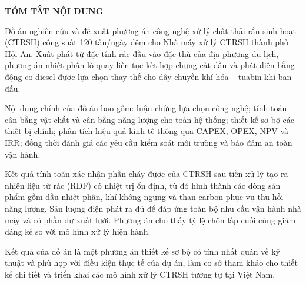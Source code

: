 \documentclass[../main.tex]{subfiles}
\begin{document}
\begin{center}
    \Large{\textbf{TÓM TẮT NỘI DUNG}}\\
\end{center}
\vspace{1cm}

Đồ án nghiên cứu và đề xuất phương án công nghệ xử lý chất thải rắn sinh hoạt (CTRSH) công suất 120 tấn/ngày đêm cho Nhà máy xử lý CTRSH thành phố Hội An. Xuất phát từ đặc tính rác đầu vào đặc thù của địa phương du lịch, phương án nhiệt phân lò quay liên tục kết hợp chưng cất dầu và phát điện bằng động cơ diesel được lựa chọn thay thế cho dây chuyền khí hóa -- tuabin khí ban đầu.

Nội dung chính của đồ án bao gồm: luận chứng lựa chọn công nghệ; tính toán cân bằng vật chất và cân bằng năng lượng cho toàn hệ thống; thiết kế sơ bộ các thiết bị chính; phân tích hiệu quả kinh tế thông qua CAPEX, OPEX, NPV và IRR; đồng thời đánh giá các yêu cầu kiểm soát môi trường và bảo đảm an toàn vận hành.

Kết quả tính toán xác nhận phần cháy được của CTRSH sau tiền xử lý tạo ra nhiên liệu từ rác (RDF) có nhiệt trị ổn định, từ đó hình thành các dòng sản phẩm gồm dầu nhiệt phân, khí không ngưng và than carbon phục vụ thu hồi năng lượng. Sản lượng điện phát ra đủ để đáp ứng toàn bộ nhu cầu vận hành nhà máy và có phần dư xuất lưới. Phương án cho thấy tỷ lệ chôn lấp cuối cùng giảm đáng kể so với mô hình xử lý hiện hành.

Kết quả của đồ án là một phương án thiết kế sơ bộ có tính nhất quán về kỹ thuật và phù hợp với điều kiện thực tế của dự án, làm cơ sở tham khảo cho thiết kế chi tiết và triển khai các mô hình xử lý CTRSH tương tự tại Việt Nam.

\end{document}
